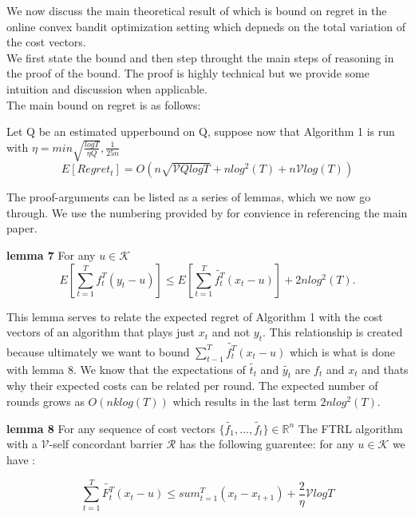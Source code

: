 We now discuss the main theoretical result of \citep{hazan}
which is bound on regret in the online convex bandit optimization setting which depneds
on the total variation of the cost vectors.\\

We first state the bound and then step throught the main steps of reasoning in the proof
of the bound. The proof is highly technical but we provide some intuition and discussion when
applicable.\\

The main bound on regret is as follows:

Let Q be an estimated upperbound on Q, suppose now that Algorithm 1 is run with
$\eta = min{\sqrt{\frac{log T}{\eta Q}}, \frac{1}{25n}}$
\begin{equation}
E[Regret_t] = O(n \sqrt{\mathcal{V}Q log T} + n log^2(T) + n \mathcal{V}log(T))
\end{equation}


The proof-arguments can be listed as a series of lemmas, which we now go through.
We use the numbering provided by \citep{hazan} for convience in referencing the main paper.

\textbf{lemma 7}
For any $u \in \mathcal{K}$
\begin{equation}
E[\sum_{t=1}^T f_{t}^T(y_t - u)] \leq E[\sum_{t=1}^T \tilde{f_{t}^T}(x_t - u)] + 2nlog^2(T).
\end{equation}

This lemma serves to relate the expected regret of Algorithm 1 with the cost vectors
of an algorithm that plays just $x_t$ and not $y_t$. This relationship is created because
ultimately we want to bound $\sum_{t-1}^T \tilde{f_t^T}(x_t - u)$  which is what is done with 
lemma 8. We know that the expectations of $\tilde{t_t}$ and $\tilde{y_t}$ are $f_t$ and $x_t$ 
and thats why their expected costs can be related per round. The expected number of rounds
grows as $O(nklog(T))$ which results in the last term $2nlog^2(T)$. 

\textbf{lemma 8}
For any sequence of cost vectors $\{\tilde{f_1}, ...,\tilde{f_t}\} \in \mathbb{R}^n$
The FTRL algorithm with a $\mathcal{V}$-self concordant barrier $\mathcal{R}$ has the following
guarentee: for any $u \in \mathcal{K}$ we have :

\begin{equation}
\sum_{t=1}^T \tilde{F_{t}^T} (x_t - u) \leq sum_{t=1}^T (x_t - x_{t+1}) + \frac{2}{\eta}\mathcal{V}
log T
\end{equation}

